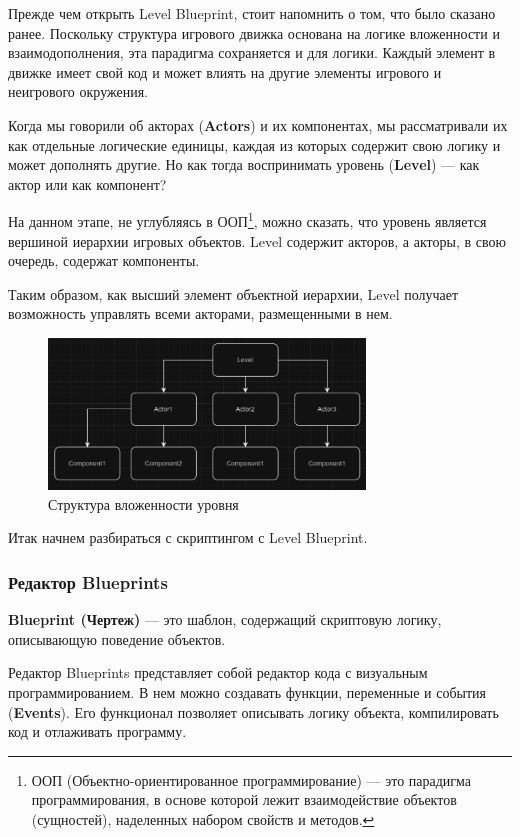 Прежде чем открыть Level Blueprint, стоит напомнить о том, что было сказано ранее. Поскольку структура игрового движка основана на логике вложенности и взаимодополнения, эта парадигма сохраняется и для логики. Каждый элемент в движке имеет свой код и может влиять на другие элементы игрового и неигрового окружения.

Когда мы говорили об акторах (\textbf{Actors}) и их компонентах, мы рассматривали их как отдельные логические единицы, каждая из которых содержит свою логику и может дополнять другие. Но как тогда воспринимать уровень (\textbf{Level}) — как актор или как компонент?

На данном этапе, не углубляясь в ООП\footnote{ООП (Объектно-ориентированное программирование) — это парадигма программирования, в основе которой лежит взаимодействие объектов (сущностей), наделенных набором свойств и методов.}, можно сказать, что уровень является вершиной иерархии игровых объектов. Level содержит акторов, а акторы, в свою очередь, содержат компоненты. 

Таким образом, как высший элемент объектной иерархии, Level получает возможность управлять всеми акторами, размещенными в нем.


\begin{figure}[h]
    \centering
    \includegraphics[width=0.75\textwidth]{Lections/BasicStructure.png}
    \caption{Структура вложенности уровня}
\end{figure}

Итак начнем разбираться с скриптингом с Level Blueprint. 
\newpage
\subsubsection{Редактор Blueprints}

\textbf{Blueprint (Чертеж)} — это шаблон, содержащий скриптовую логику, описывающую поведение объектов.

Редактор Blueprints представляет собой редактор кода с визуальным программированием. В нем можно создавать функции, переменные и события (\textbf{Events}). Его функционал позволяет описывать логику объекта, компилировать код и отлаживать программу.

